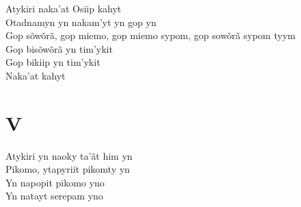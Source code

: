 \begin{linenumbers}\begingroup\raggedright
 
\noindent   Atykiri naka'at Osiip kahyt\\
  Otadnamyn yn nakam'yt yn gop yn\\
  Gop sõwõrã, gop miemo, gop miemo sypom, gop sowõrã sypom tyym\\
  Gop bisõwõrã yn tim'ykit\\
  Gop bikiip yn tim'ykit\\
  Naka'at kahyt
 
 
\medskip
\section{V}

  \noindent Atykiri yn naoky ta'ãt him yn\\
  Pikomo, ytapyriit pikomty yn\\
  Yn napopit pikomo yno\\
  Yn natayt serepam yno
 
\end{linenumbers}\endgroup

\bigskip

